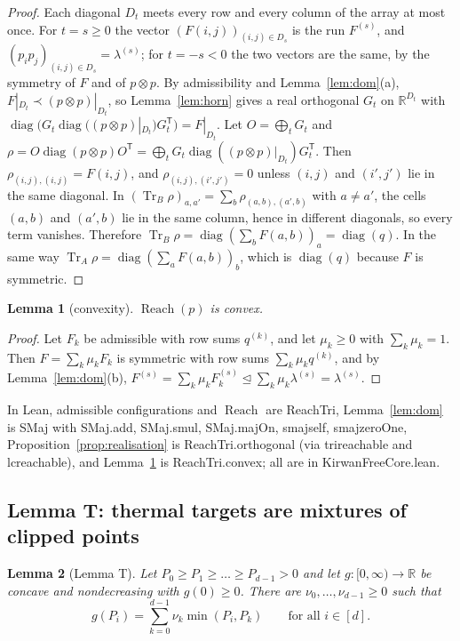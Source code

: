 \documentclass[11pt]{amsart}
\newtheorem{lemma}{Lemma}[section]
\theoremstyle{definition}
\theoremstyle{remark}
\numberwithin{equation}{section}
\newcommand{\R}{\mathbb{R}}
\newcommand{\Tr}{\operatorname{Tr}}
\newcommand{\diag}{\operatorname{diag}}
\newcommand{\Reach}{\operatorname{Reach}}
\newcommand{\dom}{\trianglelefteq}
\newcommand{\leanus}{\textunderscore\allowbreak}
\newcommand{\lean}[1]{{\ttfamily\let\_\leanus #1}}
\begin{document}
\begin{proof}
Each diagonal $D_t$ meets every row and every column of the array at most once. For $t=s\ge0$ the
vector $(F(i,j))_{(i,j)\in D_s}$ is the run $F^{(s)}$, and $(p_ip_j)_{(i,j)\in D_s}=\lambda^{(s)}$; for
$t=-s<0$ the two vectors are the same, by the symmetry of $F$ and of $p\otimes p$. By admissibility
and Lemma~\ref{lem:dom}(a), $F|_{D_t}\prec(p\otimes p)|_{D_t}$, so Lemma~\ref{lem:horn} gives a real
orthogonal $G_t$ on $\R^{D_t}$ with $\diag(G_t\diag((p\otimes p)|_{D_t})G_t^{\mathsf T})=F|_{D_t}$. Let
$O=\bigoplus_tG_t$ and $\rho=O\diag(p\otimes p)O^{\mathsf T}=\bigoplus_tG_t\diag((p\otimes p)|_{D_t})G_t^{\mathsf T}$.
Then $\rho_{(i,j),(i,j)}=F(i,j)$, and $\rho_{(i,j),(i',j')}=0$ unless $(i,j)$ and $(i',j')$ lie in the same
diagonal. In $(\Tr_B\rho)_{a,a'}=\sum_b\rho_{(a,b),(a',b)}$ with $a\ne a'$, the cells $(a,b)$ and $(a',b)$
lie in the same column, hence in different diagonals, so every term vanishes. Therefore
$\Tr_B\rho=\diag(\sum_bF(a,b))_a=\diag(q)$. In the same way
$\Tr_A\rho=\diag(\sum_aF(a,b))_b$, which is $\diag(q)$ because $F$ is symmetric.
\end{proof}

\begin{lemma}[convexity]\label{lem:convex}
$\Reach(p)$ is convex.
\end{lemma}

\begin{proof}
Let $F_k$ be admissible with row sums $q^{(k)}$, and let $\mu_k\ge0$ with $\sum_k\mu_k=1$. Then
$F=\sum_k\mu_kF_k$ is symmetric with row sums $\sum_k\mu_kq^{(k)}$, and by Lemma~\ref{lem:dom}(b),
$F^{(s)}=\sum_k\mu_kF_k^{(s)}\dom\sum_k\mu_k\lambda^{(s)}=\lambda^{(s)}$.
\end{proof}

In Lean, admissible configurations and $\Reach$ are \lean{ReachTri}, Lemma~\ref{lem:dom} is
\lean{SMaj} with \lean{SMaj.add}, \lean{SMaj.smul}, \lean{SMaj.majOn}, \lean{smaj\_self},
\lean{smaj\_zeroOne}, Proposition~\ref{prop:realisation} is \lean{ReachTri.orthogonal} (via
\lean{tri\_reachable} and \lean{lc\_reachable}), and Lemma~\ref{lem:convex} is \lean{ReachTri.convex};
all are in \lean{KirwanFreeCore.lean}.

\subsection{Lemma T: thermal targets are mixtures of clipped points}

\begin{lemma}[Lemma T]\label{lem:T}
Let $P_0\ge P_1\ge\dots\ge P_{d-1}>0$ and let $g:[0,\infty)\to\R$ be concave and nondecreasing with
$g(0)\ge0$. There are $\nu_0,\dots,\nu_{d-1}\ge0$ such that
\[
  g(P_i)=\sum_{k=0}^{d-1}\nu_k\min(P_i,P_k)\qquad\text{for all }i\in[d] .
\]
\end{lemma}
\end{document}
